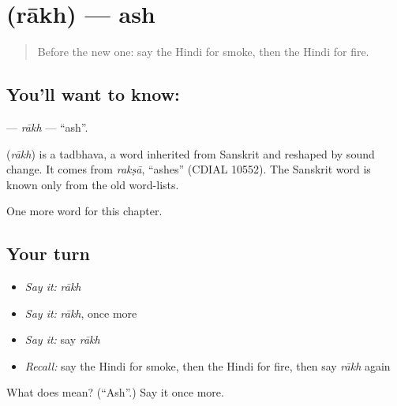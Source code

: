 \section[\texorpdfstring{\hi{राख} (rākh)}{राख (rākh)}]{ (rākh) — ash}

\label{lesson:HI-C268-rakh}



\begin{quote}
Before the new one: say the Hindi for smoke, then the Hindi for fire.
\end{quote}

\subsection*{You'll want to know: }
\textbf{} — \emph{rākh} — \textquotedblleft{}ash\textquotedblright{}.

\begin{cousinweb}
\textbf{} (\emph{rākh}) is a tadbhava, a word inherited from Sanskrit and reshaped by sound change. It comes from \emph{rakṣā}, \textquotedblleft{}ashes\textquotedblright{} (CDIAL 10552). The Sanskrit word is known only from the old word-lists.
\end{cousinweb}

\begin{grammarlens}[title={What you've built}]
One more word for this chapter.
\end{grammarlens}

\subsection*{Your turn}
\begin{itemize}
\raggedright
  \item \emph{Say it:} \emph{rākh}
  \item \emph{Say it:} \emph{rākh}, once more
  \item \emph{Say it:} say \emph{rākh}
  \item \emph{Recall:} say the Hindi for smoke, then the Hindi for fire, then say \emph{rākh} again
\end{itemize}

\begin{tcolorbox}[breakable,colback=teal!4,colframe=teal!35!black,title={Before you move on}]
What does  mean? (\textquotedblleft{}Ash\textquotedblright{}.) Say it once more.
\end{tcolorbox}
